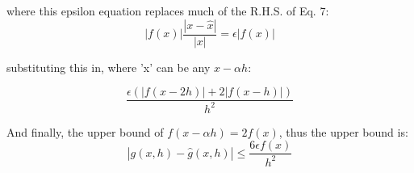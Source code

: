 \documentclass{article}
\begin{document}
where this epsilon equation replaces much of the R.H.S. of Eq. 7: 
\begin{equation}
    \left|f(x)\right| \frac{\left|x-\hat{x}\right|}{\left|x\right|} = \epsilon \left|f(x)\right|
\end{equation}

substituting this in, where 'x' can be any $x-\alpha h$:

\begin{equation}
    \frac{\epsilon(\left| f(x-2h) \right| + 2 \left| f(x-h) \right|)}{h^2}
\end{equation}

And finally, the upper bound of $f(x-\alpha h) = 2f(x)$, thus the upper bound is:
\begin{equation}
    \left| g(x,h) - \hat{g}(x,h) \right| \leq \frac{6\epsilon f(x)}{h^2}
\end{equation}
\end{document}
